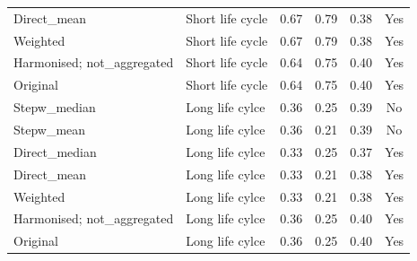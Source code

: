 \documentclass[12pt]{article}
\begin{document}
\begin{table}[H]
\begin{tabular}{l|l|c|c|c|c}
      Direct\_mean & Short life cycle & 0.67 & 0.79 & 0.38 & Yes \\ 
      Weighted & Short life cycle & 0.67 & 0.79 & 0.38 & Yes\\ 
      Harmonised; not\_aggregated & Short life cycle & 0.64 & 0.75 & 0.40 & Yes \\ 
      Original & Short life cycle & 0.64 & 0.75 & 0.40 & Yes \\ 
      \midrule
      Stepw\_median & Long life cylce & 0.36 & 0.25 & 0.39 & No \\ 
      Stepw\_mean & Long life cylce & 0.36 & 0.21 & 0.39 & No \\
      Direct\_median & Long life cylce & 0.33 & 0.25 & 0.37 & Yes\\ 
      Direct\_mean & Long life cylce & 0.33 & 0.21 & 0.38 & Yes \\ 
      Weighted & Long life cylce & 0.33 & 0.21 & 0.38 & Yes \\ 
      Harmonised; not\_aggregated & Long life cylce & 0.36 & 0.25 & 0.40 & Yes \\ 
      Original & Long life cylce & 0.36 & 0.25 & 0.40 & Yes\\ 
    \bottomrule
    \end{tabular}
\end{table}
\end{document}
